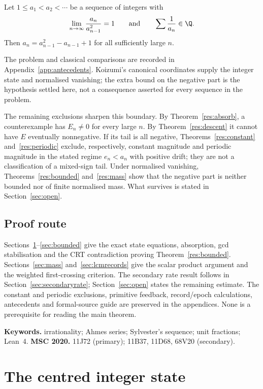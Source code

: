 \documentclass[11pt]{article}
\begin{document}
\begin{problem}[Erd\H{o}s \#243]\label{res:problem}
Let $1\le a_1<a_2<\cdots$ be a sequence of integers with
\[
 \lim_{n\to\infty}\frac{a_n}{a_{n-1}^{2}}=1
 \qquad\text{and}\qquad
 \sum\frac{1}{a_n}\in\Q .
\]
Then $a_n=a_{n-1}^{2}-a_{n-1}+1$ for all sufficiently large $n$.
\end{problem}

\noindent The problem and classical comparisons are recorded in
Appendix~\ref{app:antecedents}.  Koizumi's canonical coordinates supply the
integer state and normalised vanishing; the extra bound on the negative
part is the hypothesis settled here, not a consequence asserted for every
sequence in the problem.

\noindent The remaining exclusions sharpen this boundary.  By
Theorem~\ref{res:absorb}, a counterexample has $E_n\ne0$ for
every large $n$.  By Theorem~\ref{res:descent} it cannot have $E$ eventually
nonnegative.  If its tail is all negative, Theorems~\ref{res:constant}
and~\ref{res:periodic} exclude, respectively, constant magnitude and periodic
magnitude in the stated regime $e_n<a_n$ with positive drift; they are not a
classification of a mixed-sign tail.  Under normalised vanishing,
Theorems~\ref{res:bounded} and~\ref{res:mass} show that the negative part is
neither bounded nor of finite normalised mass.  What survives is stated in
Section~\ref{sec:open}.

\subsection*{Proof route}
Sections~\ref{sec:state}--\ref{sec:bounded} give the exact state equations,
absorption, gcd stabilisation and the CRT contradiction proving
Theorem~\ref{res:bounded}.  Sections~\ref{sec:mass}
and~\ref{sec:lcmrecords} give the scalar product argument and the weighted
first-crossing criterion.  The secondary rate result follows in
Section~\ref{sec:secondaryrate}; Section~\ref{sec:open} states the remaining
estimate.  The constant and periodic exclusions, primitive feedback,
record/epoch calculations, antecedents and formal-source guide are preserved
in the appendices.  None is a prerequisite for reading the main theorem.

\medskip
\noindent\textbf{Keywords.} irrationality; Ahmes series; Sylvester's sequence;
unit fractions; Lean~4.
\qquad
\textbf{MSC 2020.} 11J72 (primary); 11B37, 11D68, 68V20 (secondary).

\section{The centred integer state}\label{sec:state}
\end{document}
